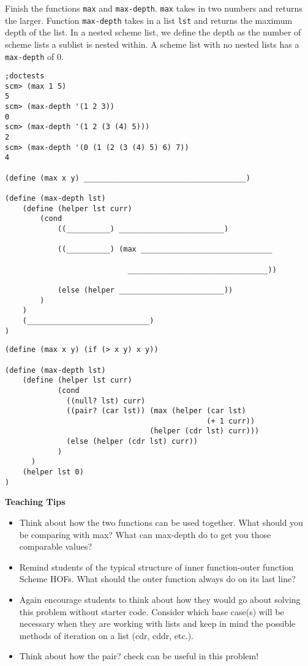 \begin{blocksection}
\question Finish the functions \lstinline{max} and \lstinline{max-depth}. \lstinline{max} takes in two numbers and returns the larger. Function \lstinline{max-depth} takes in a list \lstinline{lst} and returns the maximum depth of the list. In a nested scheme list, we define the depth as the number of scheme lists a sublist is nested within. A scheme list with no nested lists has a \lstinline{max-depth} of 0. 

\begin{lstlisting}
;doctests
scm> (max 1 5)
5
scm> (max-depth '(1 2 3))
0
scm> (max-depth '(1 2 (3 (4) 5)))
2
scm> (max-depth '(0 (1 (2 (3 (4) 5) 6) 7))
4

(define (max x y) _____________________________________)

(define (max-depth lst)
    (define (helper lst curr)
        (cond 
            ((__________) ________________________)

            ((__________) (max ______________________________

                            ________________________________))

            (else (helper ________________________))
        )
    )
    (____________________________)
)
\end{lstlisting}

\begin{solution}[0in]
\begin{lstlisting}
(define (max x y) (if (> x y) x y))

(define (max-depth lst)
    (define (helper lst curr)
            (cond 
              ((null? lst) curr)
              ((pair? (car lst)) (max (helper (car lst) 
                                              (+ 1 curr)) 
                                 (helper (cdr lst) curr)))
              (else (helper (cdr lst) curr))
            )
      )
    (helper lst 0)
)
\end{lstlisting}
\end{solution}
\end{blocksection}
\begin{questionmeta}
\textbf{Teaching Tips}
\begin{itemize}
	\item Think about how the two functions can be used together. What should you be comparing with max? What can max-depth do to get you those comparable values?
	\item Remind students of the typical structure of inner function-outer function Scheme HOFs. What should the outer function always do on its last line?
	\item Again encourage students to think about how they would go about solving this problem without starter code. Consider which base case(s) will be necessary when they are working with lists and keep in mind the possible methods of iteration on a list (cdr, cddr, etc.).
	\item Think about how the pair? check can be useful in this problem!
\end{itemize}
\end{questionmeta}